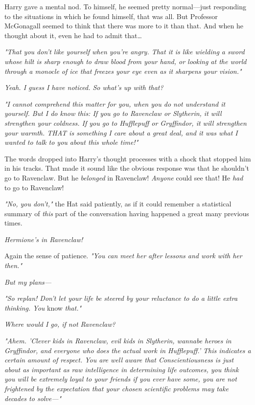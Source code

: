 Harry gave a mental nod. To himself, he seemed pretty normal---just responding to the situations in which he found himself, that was all. But Professor McGonagall seemed to think that there was more to it than that. And when he thought about it, even he had to admit that{\ldots}

\emph{"That you don't like yourself when you're angry. That it is like wielding a sword whose hilt is sharp enough to draw blood from your hand, or looking at the world through a monocle of ice that freezes your eye even as it sharpens your vision."}

\emph{Yeah. I guess I have noticed. So what's up with that?}

\emph{"I cannot comprehend this matter for you, when you do not understand it yourself. But I do know this: If you go to Ravenclaw or Slytherin, it will strengthen your coldness. If you go to Hufflepuff or Gryffindor, it will strengthen your warmth. THAT is something I care about a great deal, and it was what I wanted to talk to you about this whole time!"}

The words dropped into Harry's thought processes with a shock that stopped him in his tracks. That made it sound like the obvious response was that he shouldn't go to Ravenclaw. But he \emph{belonged} in Ravenclaw! \emph{Anyone} could see that! He \emph{had} to go to Ravenclaw!

\emph{"No, you don't,"} the Hat said patiently, as if it could remember a statistical summary of \emph{this} part of the conversation having happened a great many previous times.

\emph{Hermione's in Ravenclaw!}

Again the sense of patience. \emph{"You can meet her after lessons and work with her then."}

\emph{But my plans---}

\emph{"So replan! Don't let your life be steered by your reluctance to do a little extra thinking. You} know\emph{ that."}

\emph{Where would I go, if not Ravenclaw?}

\emph{"Ahem. 'Clever kids in Ravenclaw, evil kids in Slytherin, wannabe heroes in Gryffindor, and everyone who does the actual work in Hufflepuff.' This indicates a certain amount of respect. You are well aware that Conscientiousness is just about as important as raw intelligence in determining life outcomes, you think you will be extremely loyal to your friends if you ever have some, you are not frightened by the expectation that your chosen scientific problems may take decades to solve---"}

